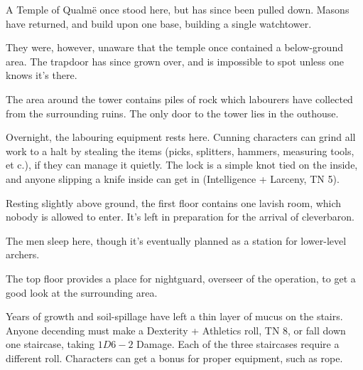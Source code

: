 \label{green_tower_map}

\begin{multicols}{2}

A Temple of Qualm\"{e} once stood here, but has since been pulled down.  Masons have returned, and build upon one base, building a single watchtower.

They were, however, unaware that the temple once contained a below-ground area.  The trapdoor has since grown over, and is impossible to spot unless one knows it's there.


The area around the tower contains piles of rock which labourers have collected from the surrounding ruins.  The only door to the tower lies in the outhouse.

\columnbreak


\humanfarmer


Overnight, the labouring equipment rests here.  Cunning characters can grind all work to a halt by stealing the items (picks, splitters, hammers, measuring tools, et c.), if they can manage it quietly.  The lock is a simple knot tied on the inside, and anyone slipping a knife inside can get in (Intelligence + Larceny, TN 5).


Resting slightly above ground, the first floor contains one lavish room, which nobody is allowed to enter.  It's left in preparation for the arrival of \gls{cleverbaron}.

The men sleep here, though it's eventually planned as a station for lower-level archers.


The top floor provides a place for \gls{nightguard}, overseer of the operation, to get a good look at the surrounding area.




Years of growth and soil-spillage have left a thin layer of mucus on the stairs.  Anyone decending must make a Dexterity + Athletics roll, TN 8, or fall down one staircase, taking $1D6-2$ Damage.  Each of the three staircases require a different roll.  Characters can get a bonus for proper equipment, such as rope.


\end{multicols}
